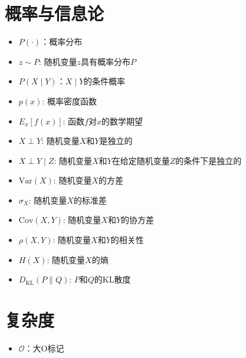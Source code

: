 \documentclass[letterpaper,10pt,english]{sphinxmanual}
\begin{document}
\section{概率与信息论}
\label{\detokenize{chapter_notation/index:id6}}\begin{itemize}
\item {} 
\sphinxAtStartPar
\(P(\cdot)\)：概率分布

\item {} 
\sphinxAtStartPar
\(z \sim P\): 随机变量\(z\)具有概率分布\(P\)

\item {} 
\sphinxAtStartPar
\(P(X \mid Y)\)：\(X\mid Y\)的条件概率

\item {} 
\sphinxAtStartPar
\(p(x)\): 概率密度函数

\item {} 
\sphinxAtStartPar
\({E}_{x} [f(x)]\): 函数\(f\)对\(x\)的数学期望

\item {} 
\sphinxAtStartPar
\(X \perp Y\): 随机变量\(X\)和\(Y\)是独立的

\item {} 
\sphinxAtStartPar
\(X \perp Y \mid Z\):
随机变量\(X\)和\(Y\)在给定随机变量\(Z\)的条件下是独立的

\item {} 
\sphinxAtStartPar
\(\mathrm{Var}(X)\): 随机变量\(X\)的方差

\item {} 
\sphinxAtStartPar
\(\sigma_X\): 随机变量\(X\)的标准差

\item {} 
\sphinxAtStartPar
\(\mathrm{Cov}(X, Y)\):
随机变量\(X\)和\(Y\)的协方差

\item {} 
\sphinxAtStartPar
\(\rho(X, Y)\): 随机变量\(X\)和\(Y\)的相关性

\item {} 
\sphinxAtStartPar
\(H(X)\): 随机变量\(X\)的熵

\item {} 
\sphinxAtStartPar
\(D_{\mathrm{KL}}(P\|Q)\): \(P\)和\(Q\)的KL\sphinxhyphen{}散度

\end{itemize}


\section{复杂度}
\label{\detokenize{chapter_notation/index:id7}}\begin{itemize}
\item {} 
\sphinxAtStartPar
\(\mathcal{O}\)：大O标记

\end{itemize}
\end{document}
